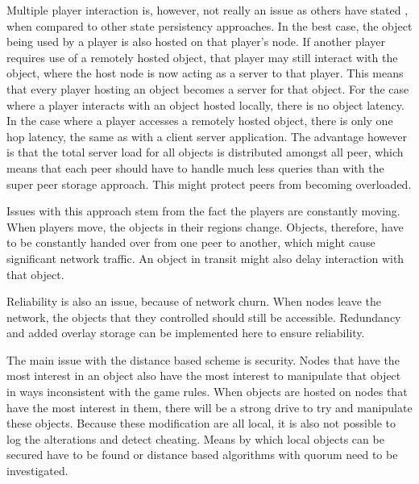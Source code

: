 \documentclass[journal,oneside,a4paper,onecolumn]{IEEEtran}
\begin{document}
Multiple player interaction is, however, not really an issue as others have stated \cite{}, when compared to other state persistency approaches. In the best case, the object being used by a player is also hosted on that player's node. If another player requires use of a remotely hosted object, that player may still interact with the object, where the host node is now acting as a server to that player. This means that every player hosting an object becomes a server for that object. For the case where a player interacts with an object hosted locally, there is no object latency. In the case where a player accesses a remotely hosted object, there is only one hop latency, the same as with a client server application. The advantage however is that the total server load for all objects is distributed amongst all peer, which means that each peer should have to handle much less queries than with the super peer storage approach. This might protect peers from becoming overloaded.

Issues with this approach stem from the fact the players are constantly moving. When players move, the objects in their regions change. Objects, therefore, have to be constantly handed over from one peer to another, which might cause significant network traffic. An object in transit might also delay interaction with that object.

Reliability is also an issue, because of network churn. When nodes leave the network, the objects that they controlled should still be accessible. Redundancy and added overlay storage can be implemented here to ensure reliability.

The main issue with the distance based scheme is security. Nodes that have the most interest in an object also have the most interest to manipulate that object in ways inconsistent with the game rules. When objects are hosted on nodes that have the most interest in them, there will be a strong drive to try and manipulate these objects. Because these modification are all local, it is also not possible to log the alterations and detect cheating. Means by which local objects can be secured have to be found or distance based algorithms with quorum need to be investigated.
\end{document}
